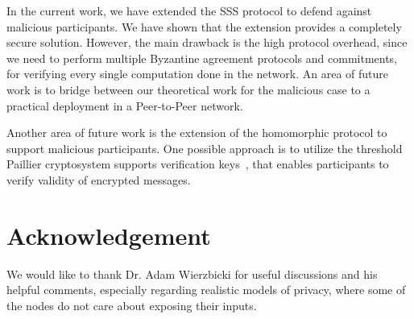 \documentclass[10pt]{svjour3}
\begin{document}
In the current work, we have extended the SSS protocol to defend against
malicious participants. We have shown that the extension provides a completely secure solution.
However, the main drawback is the high protocol overhead, since we need to perform multiple
Byzantine agreement protocols and commitments, for verifying every single computation done in the network.
An area of future work is to bridge between our theoretical work for the malicious case to
a practical deployment in a Peer-to-Peer network.

Another area of future work is the extension of the homomorphic
protocol to support malicious participants. One possible approach
is to utilize the threshold Paillier cryptosystem supports
verification keys~\cite{Paillier2}, that enables participants  to
verify validity of encrypted messages.

\section*{Acknowledgement}
We would like to thank Dr. Adam Wierzbicki for useful discussions and his helpful comments, especially regarding
realistic models of privacy, where some of the nodes do not care about exposing their inputs.



\end{document}
